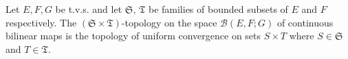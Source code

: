 Let $E, F, G$ be t.v.s. and let $\mathfrak{S}$, $\mathfrak{T}$ be families of bounded subsets of $E$ and $F$ respectively. The $(\mathfrak{S} \times \mathfrak{T})$-topology on the space $\mathcal{B}(E, F; G)$ of continuous bilinear maps is the topology of uniform convergence on sets $S \times T$ where $S \in \mathfrak{S}$ and $T \in \mathfrak{T}$.
